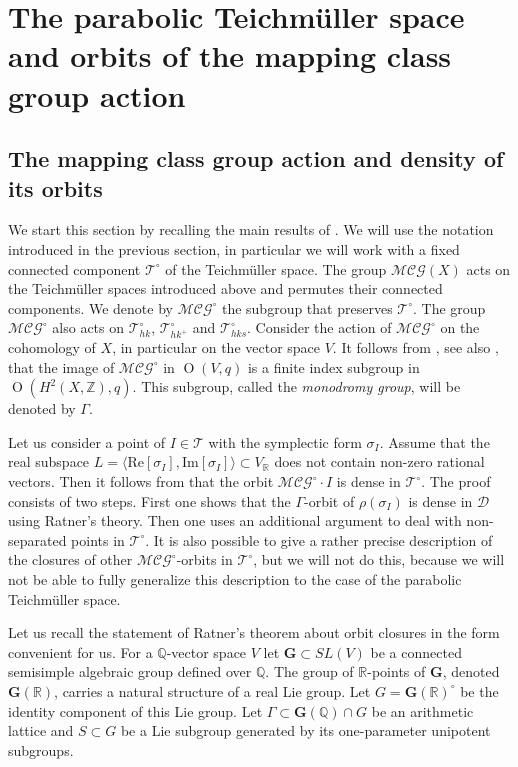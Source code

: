 \documentclass[11pt]{article}
\newcommand{\6}{\partial}
\newcommand{\bbZ}{\mathbb{Z}}
\newcommand{\bbQ}{\mathbb{Q}}
\newcommand{\bbR}{\mathbb{R}}
\newcommand{\rmO}{\operatorname{O}}
\newcommand{\Teich}{\mathcal{T}}
\newcommand{\TeichHK}{\Teich_{h\!k}}
\newcommand{\TeichHKa}{\Teich_{h\!k^+}}
\newcommand{\TeichHKb}{\Teich_{h\!k\!s}}
\newcommand{\TeichCS}{\Teich_{cs}}
\newcommand{\MC}{\mathcal{MCG}}
\newcommand{\Dom}{\mathcal{D}}
\newcommand{\Per}{\rho}
\begin{document}
\section{The parabolic Teichm\"uller space and orbits of the mapping class group action}\label{sec_teich}

\subsection{The mapping class group action and density of its orbits}

We start this section by recalling the main results of \cite{V2}. We will use the notation
introduced in the previous section, in particular we will work with a fixed connected component
$\Teich^\circ$ of the Teichm\"uller space. The group $\MC(X)$ acts on the Teichm\"uller spaces
introduced above and permutes their connected components. We denote by $\MC^\circ$ the
subgroup that preserves $\Teich^\circ$. The group $\MC^\circ$ also acts on $\TeichHK^\circ$,
$\TeichHKa^\circ$ and $\TeichHKb^\circ$.%
Consider the action of $\MC^\circ$ on the cohomology
of $X$, in particular on the vector space $V$. It follows from \cite{V1}, see also \cite{Ma}, that the image of
$\MC^\circ$ in $\rmO(V,q)$ is a finite index subgroup in $\rmO(H^2(X,\bbZ),q)$. This subgroup,
called the {\it monodromy group}, will be denoted by $\Gamma$.

Let us consider a point of $I\in \Teich$ with the symplectic form $\sigma_I$.
Assume that the real subspace $L = \langle\mathrm{Re}[\sigma_I],\mathrm{Im}[\sigma_I]\rangle \subset V_\bbR$
does not contain non-zero rational vectors. Then it follows from \cite{V2} that the 
orbit $\MC^\circ\cdot I$ is dense in $\Teich^\circ$. The proof consists of
two steps. First one shows that the $\Gamma$-orbit of $\Per(\sigma_I)$ is dense in $\Dom$
using Ratner's theory. Then one uses an additional argument to deal with non-separated points
in $\Teich^\circ$.
It is also possible to give a rather precise description
of the closures of other $\MC^\circ$-orbits in $\Teich^\circ$, but we will not do this,
because we will not be able to fully generalize this description to the case of the parabolic
Teichm\"uller space.  

Let us recall the statement of Ratner's theorem about orbit closures in the form convenient for us.
For a $\bbQ$-vector space $V$ let  $\mathbf{G}\subset SL(V)$ be a connected semisimple algebraic group
defined over $\bbQ$. The group of $\bbR$-points of $\mathbf{G}$, denoted $\mathbf{G}(\bbR)$,
carries a natural structure of a real Lie group. Let $G = \mathbf{G}(\bbR)^\circ$ be the identity component
of this Lie group. Let $\Gamma\subset \mathbf{G}(\bbQ)\cap G$ be an arithmetic lattice and $S\subset G$
be a Lie subgroup generated by its one-parameter unipotent subgroups.
\end{document}
